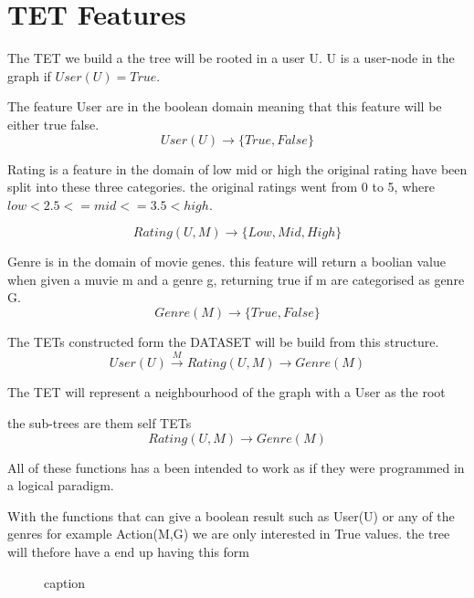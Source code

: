 \section{TET Features}
The TET we build a the tree will be rooted in a user U.
U is a user-node in the graph if $User(U) = True$. 

The feature User are in the boolean domain meaning that this feature will be either true false.
\begin{equation}
User(U)\rightarrow \{True, False\}
\end{equation}

Rating is a feature in the domain of low mid or high the original rating have been split into these three categories.
the original ratings went from 0 to 5, where $low<2.5<=mid<=3.5<high$.

\begin{equation}
Rating(U, M) \rightarrow \{Low, Mid, High\}
\end{equation}

Genre is in the domain of movie genes. this feature will return a boolian value when given a muvie m and a genre g, returning true if m are categorised as genre G.
\begin{equation}
Genre(M) \rightarrow \{True, False\}
\end{equation}


The TETs constructed form the DATASET will be build from this structure.
\begin{equation}
User(U) \stackrel{M}{\longrightarrow} Rating(U,M) \longrightarrow Genre(M)
\end{equation}

The TET will represent a neighbourhood of the graph with a User as the root

the sub-trees are them self TETs
\begin{equation}
Rating(U,M) \longrightarrow Genre(M)
\end{equation}

All of these functions has a been intended to work as if they were programmed in a logical paradigm. 

With the functions that can give a boolean result such as User(U) or any of the genres for example Action(M,G) we are only interested in True values. the tree will thefore have a end up having this form

\begin{figure}[H]
    \centering
    
    \caption{caption}
    \label{fig:caption}
	
\end{figure}

